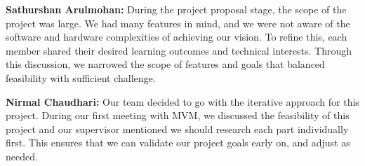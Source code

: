 \documentclass{article}
\begin{document}
\begin{enumerate}
    \textbf{Sathurshan Arulmohan:} During the project proposal stage, the scope
    of the project was large. We had many features in mind, and we were not
    aware of the software and hardware complexities of achieving our vision. To
    refine this, each member shared their desired learning outcomes and
    technical interests. Through this discussion, we narrowed the scope of
    features and goals that balanced feasibility with sufficient challenge.

    \textbf{Nirmal Chaudhari:} Our team decided to go with the iterative
    approach for this project. During our first meeting with MVM, we discussed
    the feasibility of this project and our supervisor mentioned we should
    research each part individually first. This ensures that we can validate our
    project goals early on, and adjust as needed. 

\end{enumerate}  

\newpage{}



\end{document}
